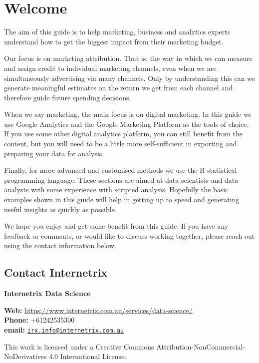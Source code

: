 \documentclass[]{book}
\begin{document}
{
\setcounter{tocdepth}{1}
\tableofcontents
}
\hypertarget{welcome}{%
\chapter{Welcome}\label{welcome}}

The aim of this guide is to help marketing, business and analytics experts
understand how to get the biggest impact from their marketing budget.

Our focus is on marketing attribution. That is, the way in which we can measure
and assign credit to individual marketing channels, even when we are
simultaneously advertising via many channels. Only by understanding this can
we generate meaningful estimates on the return we get from each channel and
therefore guide future spending decisions.

When we say marketing, the main focus is on digital marketing. In this guide
we use Google Analytics and the Google Marketing Platform as the
tools of choice. If you use some other digital analytics platform, you can
still benefit from the content, but you will need to be a little more self-sufficient in
exporting and preparing your data for analysis.

Finally, for more advanced and customised methods we use the R statistical
programming language. These sections are aimed at data scientists and
data analysts with some experience with scripted analysis. Hopefully the
basic examples shown in this guide will help in getting up to speed and generating
useful insights as quickly as possible.

We hope you enjoy and get some benefit from this guide. If you have any
feedback or comments, or would like to discuss working together, please reach
out using the contact information below.

\hypertarget{contact-internetrix}{%
\section{Contact Internetrix}\label{contact-internetrix}}

\textbf{Internetrix Data Science}

\textbf{Web:} \url{https://www.internetrix.com.au/services/data-science/}\\
\textbf{Phone:} +61242535300\\
\textbf{email:} \href{mailto:irx.info@internetrix.com.au}{\nolinkurl{irx.info@internetrix.com.au}}

This work is licensed under a Creative Commons Attribution-NonCommercial-NoDerivatives 4.0 International License.
\end{document}
